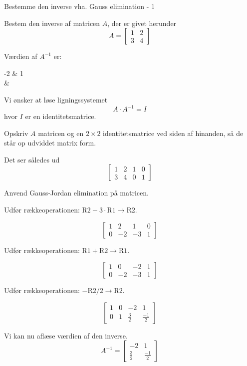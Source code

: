 \documentclass{article}
\begin{document}
\tableofcontents
\newpage

\begin{exercise}{Bestemme den inverse vha. Gauss elimination - 1}

Bestem den inverse af matricen $A$, der er givet herunder
\[
A = \left[\begin{array}{cc}
1 & 2 \\ 
3 & 4
\end{array} \right]
\]

Værdien af $A^{-1}$ er:
\begin{answermatrix}
-2 & 1 \\
 & 
\end{answermatrix}

\hint
Vi ønsker at løse ligningssystemet
\[
A \cdot A^{-1} = I
\]
hvor $I$ er en identitetsmatrice.

\hint
Opskriv $A$ matricen og en $2 \times 2$ identitetsmatrice
ved siden af hinanden, så de står op udviddet matrix form.

\hint
Det ser således ud
\[
\left[\begin{array}{cc|cc}
1 & 2 & 1 & 0 \\ 
3 & 4 & 0 & 1
\end{array} \right]
\]

\hint
Anvend Gauss-Jordan elimination på matricen.

\hint
Udfør rækkeoperationen: $\text{R2} - 3 \cdot \text{R1} \to \text{R2}$.

\hint
\[
\left[\begin{array}{cc|cc}
1 & 2 & 1 & 0 \\ 
0 & -2 & -3 & 1
\end{array} \right]
\]

\hint
Udfør rækkeoperationen: $\text{R1} + \text{R2} \to \text{R1}$.

\hint
\[
\left[\begin{array}{cc|cc}
1 & 0 & -2 & 1 \\ 
0 & -2 & -3 & 1
\end{array} \right]
\]

\hint
Udfør rækkeoperationen: $-\text{R2}/2 \to \text{R2}$.

\hint
\[
\left[\begin{array}{cc|cc}
1 & 0 & -2 & 1 \\ 
0 & 1 & \frac{3}{2} & \frac{-1}{2}
\end{array} \right]
\]

\hint
Vi kan nu aflæse værdien af den inverse.
\[
A^{-1} = \left[\begin{array}{cc}
-2 & 1 \\ 
\frac{3}{2} & \frac{-1}{2}
\end{array} \right]
\]

\end{exercise}
\end{document}
